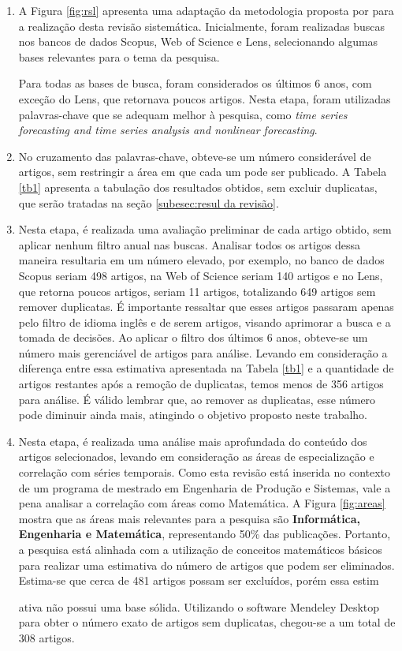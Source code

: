 \begin{enumerate}[start=1, label={\textbf{Etapa} \arabic*}]
	
	\item \label{etp:rev-1} A Figura \ref{fig:rsl} apresenta uma adaptação da metodologia proposta por  para a realização desta revisão sistemática. Inicialmente, foram realizadas buscas nos bancos de dados Scopus, Web of Science e Lens, selecionando algumas bases relevantes para o tema da pesquisa.
	
	
	
	Para todas as bases de busca, foram considerados os últimos 6 anos, com exceção do Lens, que retornava poucos artigos. Nesta etapa, foram utilizadas palavras-chave que se adequam melhor à pesquisa, como \textit{time series forecasting and time series analysis and nonlinear forecasting}.
	
	\item \label{etp:rev-2} No cruzamento das palavras-chave, obteve-se um número considerável de artigos, sem restringir a área em que cada um pode ser publicado. A Tabela \ref{tb1} apresenta a tabulação dos resultados obtidos, sem excluir duplicatas, que serão tratadas na seção \ref{subesec:resul da revisão}.
	
	\item \label{etp:rev-3} Nesta etapa, é realizada uma avaliação preliminar de cada artigo obtido, sem aplicar nenhum filtro anual nas buscas. Analisar todos os artigos dessa maneira resultaria em um número elevado, por exemplo, no banco de dados Scopus seriam 498 artigos, na Web of Science seriam 140 artigos e no Lens, que retorna poucos artigos, seriam 11 artigos, totalizando 649 artigos sem remover duplicatas. É importante ressaltar que esses artigos passaram apenas pelo filtro de idioma inglês e de serem artigos, visando aprimorar a busca e a tomada de decisões. Ao aplicar o filtro dos últimos 6 anos, obteve-se um número mais gerenciável de artigos para análise. Levando em consideração a diferença entre essa estimativa apresentada na Tabela \ref{tb1} e a quantidade de artigos restantes após a remoção de duplicatas, temos menos de 356 artigos para análise. É válido lembrar que, ao remover as duplicatas, esse número pode diminuir ainda mais, atingindo o objetivo proposto neste trabalho.
	
	\item \label{etp:rev-4} Nesta etapa, é realizada uma análise mais aprofundada do conteúdo dos artigos selecionados, levando em consideração as áreas de especialização e correlação com séries temporais. Como esta revisão está inserida no contexto de um programa de mestrado em Engenharia de Produção e Sistemas, vale a pena analisar a correlação com áreas como Matemática. A Figura \ref{fig:areas} mostra que as áreas mais relevantes para a pesquisa são \textbf{Informática, Engenharia e Matemática}, representando 50\% das publicações. Portanto, a pesquisa está alinhada com a utilização de conceitos matemáticos básicos para realizar uma estimativa do número de artigos que podem ser eliminados. Estima-se que cerca de 481 artigos possam ser excluídos, porém essa estim
	
	ativa não possui uma base sólida. Utilizando o software Mendeley Desktop para obter o número exato de artigos sem duplicatas, chegou-se a um total de 308 artigos.
	
\end{enumerate}